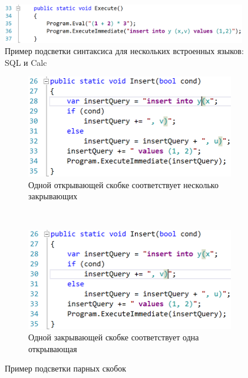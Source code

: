 \begin{figure}[H]
  \centering
 \includegraphics[width=0.95\textwidth]{pics/multilanguages_light.png}
 \caption{Пример подсветки синтаксиса для нескольких встроенных языков: SQL и Calc}
 \label{fig:sHiglighting}
\end{figure}

\begin{figure}[H]
 \centering
 \begin{subfigure}[b]{0.47\textwidth}
  \includegraphics[width=\textwidth]{pics/brackets_one_to_many_light.png}
  \caption{Одной открывающей скобке соответствует несколько закрывающих}
  \label{fig:brOneToMany}
  \end{subfigure}
  ~
 \begin{subfigure}[b]{0.47\textwidth}
  \includegraphics[width=\textwidth]{pics/brackets_one_to_one.png}
  \caption{Одной закрывающей скобке соответствует одна открывающая}
  \label{fig:brOneToone}
 \end{subfigure}

 \caption{Пример подсветки парных скобок}
 \label{fig:braces}
\end{figure}

